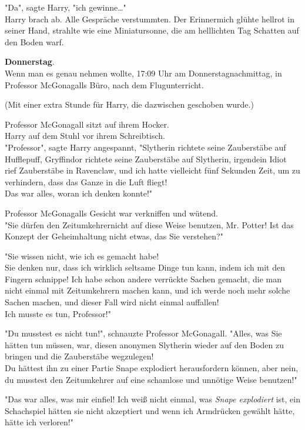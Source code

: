 {"Da", sagte Harry, "ich gewinne…"\\ Harry brach ab. Alle Gespräche verstummten. Der Erinnermich glühte hellrot in seiner Hand, strahlte wie eine Miniatursonne, die am helllichten Tag Schatten auf den Boden warf.

\textbf{Donnerstag}.\\ Wenn man es genau nehmen wollte, 17:09 Uhr am Donnerstagnachmittag, in Professor McGonagalls Büro, nach dem Flugunterricht.

(Mit einer extra Stunde für Harry, die dazwischen geschoben wurde.)

Professor McGonagall sitzt auf ihrem Hocker.\\ Harry auf dem Stuhl vor ihrem Schreibtisch.\\ "Professor", sagte Harry angespannt, "Slytherin richtete seine Zauberstäbe auf Hufflepuff, Gryffindor richtete seine Zauberstäbe auf Slytherin, irgendein Idiot rief Zauberstäbe in Ravenclaw, und ich hatte vielleicht fünf Sekunden Zeit, um zu verhindern, dass das Ganze in die Luft fliegt!\\ Das war alles, woran ich denken konnte!"

Professor McGonagalls Gesicht war verkniffen und wütend.\\ "Sie dürfen den Zeitumkehrernicht auf diese Weise benutzen, Mr. Potter! Ist das Konzept der Geheimhaltung nicht etwas, das Sie verstehen?"

"Sie wissen nicht, wie ich es gemacht habe!\\ Sie denken nur, dass ich wirklich seltsame Dinge tun kann, indem ich mit den Fingern schnippe! Ich habe schon andere verrückte Sachen gemacht, die man nicht einmal mit Zeitumkehrern machen kann, und ich werde noch mehr solche Sachen machen, und dieser Fall wird nicht einmal auffallen!\\ Ich musste es tun, Professor!"

"Du musstest es nicht tun!", schnauzte Professor McGonagall. "Alles, was Sie hätten tun müssen, war, diesen anonymen Slytherin wieder auf den Boden zu bringen und die Zauberstäbe wegzulegen!\\ Du hättest ihn zu einer Partie Snape explodiert herausfordern können, aber nein, du musstest den Zeitumkehrer auf eine schamlose und unnötige Weise benutzen!"

"Das war alles, was mir einfiel! Ich weiß nicht einmal, was \emph{Snape explodiert} ist, ein Schachspiel hätten sie nicht akzeptiert und wenn ich Armdrücken gewählt hätte, hätte ich verloren!"

}
